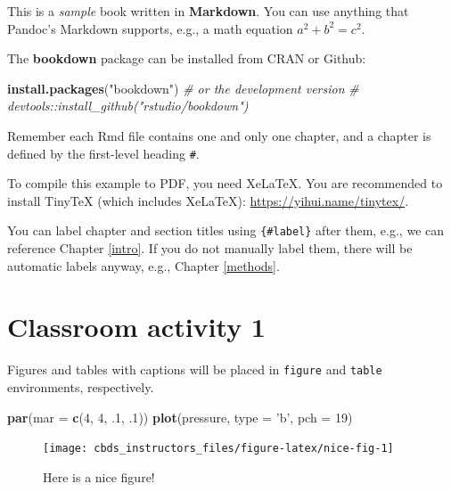 \documentclass[]{book}
\newenvironment{Shaded}{\begin{snugshade}}{\end{snugshade}}
\newcommand{\CommentTok}[1]{\textcolor[rgb]{0.56,0.35,0.01}{\textit{#1}}}
\newcommand{\DataTypeTok}[1]{\textcolor[rgb]{0.13,0.29,0.53}{#1}}
\newcommand{\DecValTok}[1]{\textcolor[rgb]{0.00,0.00,0.81}{#1}}
\newcommand{\FloatTok}[1]{\textcolor[rgb]{0.00,0.00,0.81}{#1}}
\newcommand{\KeywordTok}[1]{\textcolor[rgb]{0.13,0.29,0.53}{\textbf{#1}}}
\newcommand{\NormalTok}[1]{#1}
\newcommand{\StringTok}[1]{\textcolor[rgb]{0.31,0.60,0.02}{#1}}
\begin{document}
This is a \emph{sample} book written in \textbf{Markdown}. You can use anything that Pandoc's Markdown supports, e.g., a math equation \(a^2 + b^2 = c^2\).

The \textbf{bookdown} package can be installed from CRAN or Github:

\begin{Shaded}
\begin{Highlighting}[]
\KeywordTok{install.packages}\NormalTok{(}\StringTok{"bookdown"}\NormalTok{)}
\CommentTok{# or the development version}
\CommentTok{# devtools::install_github("rstudio/bookdown")}
\end{Highlighting}
\end{Shaded}

Remember each Rmd file contains one and only one chapter, and a chapter is defined by the first-level heading \texttt{\#}.

To compile this example to PDF, you need XeLaTeX. You are recommended to install TinyTeX (which includes XeLaTeX): \url{https://yihui.name/tinytex/}.

You can label chapter and section titles using \texttt{\{\#label\}} after them, e.g., we can reference Chapter \ref{intro}. If you do not manually label them, there will be automatic labels anyway, e.g., Chapter \ref{methods}.

\hypertarget{classroom-activity-1}{%
\section*{Classroom activity 1}\label{classroom-activity-1}}

Figures and tables with captions will be placed in \texttt{figure} and \texttt{table} environments, respectively.

\begin{Shaded}
\begin{Highlighting}[]
\KeywordTok{par}\NormalTok{(}\DataTypeTok{mar =} \KeywordTok{c}\NormalTok{(}\DecValTok{4}\NormalTok{, }\DecValTok{4}\NormalTok{, }\FloatTok{.1}\NormalTok{, }\FloatTok{.1}\NormalTok{))}
\KeywordTok{plot}\NormalTok{(pressure, }\DataTypeTok{type =} \StringTok{'b'}\NormalTok{, }\DataTypeTok{pch =} \DecValTok{19}\NormalTok{)}
\end{Highlighting}
\end{Shaded}

\begin{figure}

{\centering \texttt{[image: cbds\_instructors\_files/figure-latex/nice-fig-1]} 

}

\caption{Here is a nice figure!}\label{fig:nice-fig}
\end{figure}
\end{document}
